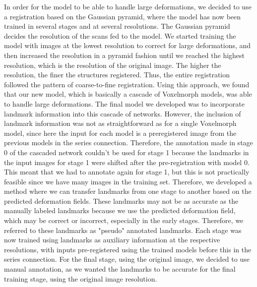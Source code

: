 \documentclass{book}
\begin{document}
	In order for the model to be able to handle large deformations, we decided to use a registration based on the Gaussian pyramid, where the model has now been trained in several stages and at several resolutions. The Gaussian pyramid decides the resolution of the scans fed to the model. We started training the model with images at the lowest resolution to correct for large deformations, and then increased the resolution in a pyramid fashion until we reached the highest resolution, which is the resolution of the original image. The higher the resolution, the finer the structures registered. Thus, the entire registration followed the pattern of coarse-to-fine registration. Using this approach, we found that our new model, which is basically a cascade of Voxelmorph models, was able to handle large deformations. The final model we developed was to incorporate landmark information into this cascade of networks. However, the inclusion of landmark information was not as straightforward as for a single Voxelmorph model, since here the input for each model is a preregistered image from the previous models in the series connection. Therefore, the annotation made in stage 0 of the cascaded network couldn't be used for stage 1 because the landmarks in the input images for stage 1 were shifted after the pre-registration with model 0. This meant that we had to annotate again for stage 1, but this is not practically feasible since we have many images in the training set. Therefore, we developed a method where we can transfer landmarks from one stage to another based on the predicted deformation fields. These landmarks may not be as accurate as the manually labeled landmarks because we use the predicted deformation field, which may be correct or incorrect, especially in the early stages. Therefore, we referred to these landmarks as "pseudo" annotated landmarks. Each stage was now trained using landmarks as auxiliary information at the respective resolutions, with inputs pre-registered using the trained models before this in the series connection. For the final stage, using the original image, we decided to use manual annotation, as we wanted the landmarks to be accurate for the final training stage, using the original image resolution.
	
\end{document}
